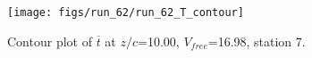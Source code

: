 \begin{figure}[H]
\centering
\texttt{[image: figs/run\_62/run\_62\_T\_contour]}
\caption{Contour plot of $\overline{t}$ at $z/c$=10.00, $V_{free}$=16.98, station 7.}
\label{fig:run_62_T_contour}
\end{figure}


